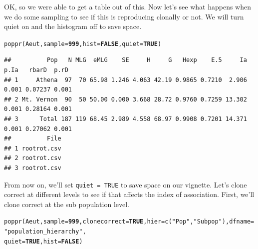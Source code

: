 \documentclass[letterpaper]{article}\usepackage[]{graphicx}\usepackage[]{color}
\makeatletter
\newcommand{\hlnum}[1]{\textcolor[rgb]{0.502,0,0.502}{\textbf{#1}}}%
\newcommand{\hlstr}[1]{\textcolor[rgb]{0.651,0.522,0}{#1}}%
\newcommand{\hlstd}[1]{\textcolor[rgb]{0,0,0}{#1}}%
\newcommand{\hlkwc}[1]{\textcolor[rgb]{0,0.502,0.753}{#1}}%
\newcommand{\hlkwd}[1]{\textcolor[rgb]{0,0.267,0.4}{#1}}%
\newenvironment{kframe}{%
 \def\at@end@of@kframe{}%
 \ifinner\ifhmode%
  \def\at@end@of@kframe{\end{minipage}}%
  \begin{minipage}{\columnwidth}%
 \fi\fi%
 \def\FrameCommand##1{\hskip\@totalleftmargin \hskip-\fboxsep
 \colorbox{shadecolor}{##1}\hskip-\fboxsep
     \hskip-\linewidth \hskip-\@totalleftmargin \hskip\columnwidth}%
 \MakeFramed {\advance\hsize-\width
   \@totalleftmargin\z@ \linewidth\hsize
   \@setminipage}}%
 {\par\unskip\endMakeFramed%
 \at@end@of@kframe}
\newenvironment{knitrout}{}{} %
\makeatother
\begin{document}
OK, so we were able to get a table out of this. Now let's see what happens when we do some sampling to see if this is reproducing clonally or not. We will turn quiet on and the histogram off to save space.
\begin{knitrout}\footnotesize
{}\color{fgcolor}\begin{kframe}
\begin{alltt}
\hlkwd{poppr}\hlstd{(Aeut,} \hlkwc{sample} \hlstd{=} \hlnum{999}\hlstd{,} \hlkwc{hist} \hlstd{=} \hlnum{FALSE}\hlstd{,} \hlkwc{quiet} \hlstd{=} \hlnum{TRUE}\hlstd{)}
\end{alltt}
\end{kframe}
\end{knitrout}

\begin{knitrout}\footnotesize
{}\color{fgcolor}\begin{kframe}
\begin{verbatim}
##          Pop   N MLG  eMLG    SE     H     G   Hexp    E.5     Ia  p.Ia   rbarD  p.rD
## 1     Athena  97  70 65.98 1.246 4.063 42.19 0.9865 0.7210  2.906 0.001 0.07237 0.001
## 2 Mt. Vernon  90  50 50.00 0.000 3.668 28.72 0.9760 0.7259 13.302 0.001 0.28164 0.001
## 3      Total 187 119 68.45 2.989 4.558 68.97 0.9908 0.7201 14.371 0.001 0.27062 0.001
##          File
## 1 rootrot.csv
## 2 rootrot.csv
## 3 rootrot.csv
\end{verbatim}
\end{kframe}
\end{knitrout}

From now on, we'll set \texttt{quiet = TRUE} to save space on our vignette. Let's clone correct at different levels to see if that affects the index of association. First, we'll clone correct at the sub population level.
\begin{knitrout}\footnotesize
{}\color{fgcolor}\begin{kframe}
\begin{alltt}
\hlkwd{poppr}\hlstd{(Aeut,} \hlkwc{sample} \hlstd{=} \hlnum{999}\hlstd{,} \hlkwc{clonecorrect} \hlstd{=} \hlnum{TRUE}\hlstd{,} \hlkwc{hier} \hlstd{=} \hlkwd{c}\hlstd{(}\hlstr{"Pop"}\hlstd{,} \hlstr{"Subpop"}\hlstd{),} \hlkwc{dfname} \hlstd{=} \hlstr{"population_hierarchy"}\hlstd{,}
    \hlkwc{quiet} \hlstd{=} \hlnum{TRUE}\hlstd{,} \hlkwc{hist} \hlstd{=} \hlnum{FALSE}\hlstd{)}
\end{alltt}
\end{kframe}
\end{knitrout}
\end{document}
